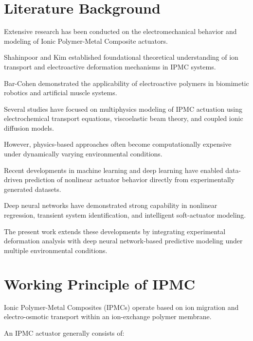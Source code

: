 \documentclass[11pt,a4paper]{article}
\begin{document}

\section{Literature Background}

Extensive research has been conducted on the electromechanical behavior and modeling of Ionic Polymer-Metal Composite actuators.

Shahinpoor and Kim established foundational theoretical understanding of ion transport and electroactive deformation mechanisms in IPMC systems.

Bar-Cohen demonstrated the applicability of electroactive polymers in biomimetic robotics and artificial muscle systems.

Several studies have focused on multiphysics modeling of IPMC actuation using electrochemical transport equations, viscoelastic beam theory, and coupled ionic diffusion models.

However, physics-based approaches often become computationally expensive under dynamically varying environmental conditions.

Recent developments in machine learning and deep learning have enabled data-driven prediction of nonlinear actuator behavior directly from experimentally generated datasets.

Deep neural networks have demonstrated strong capability in nonlinear regression, transient system identification, and intelligent soft-actuator modeling.

The present work extends these developments by integrating experimental deformation analysis with deep neural network-based predictive modeling under multiple environmental conditions.


\section{Working Principle of IPMC}

Ionic Polymer-Metal Composites (IPMCs) operate based on ion migration and electro-osmotic transport within an ion-exchange polymer membrane.

An IPMC actuator generally consists of:
\end{document}
